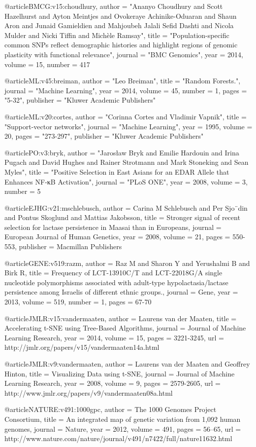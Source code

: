 @article{BMCG:v15:choudhury,
	author = "Ananyo Choudhury and Scott Hazelhurst and Ayton Meintjes and Ovokeraye Achinike-Oduaran and Shaun Aron and Junaid Gamieldien and Mahjoubeh Jalali Sefid Dashti and Nicola Mulder and Nicki Tiffin and Michèle Ramsay",
	title  = "Population-specific common SNPs reflect demographic histories and highlight regions of genomic plasticity with functional relevance",
	journal = "BMC Genomics",
	year = 2014,
	volume = 15,
	number = 417
}

@article{ML:v45:breiman,
	author = "Leo Breiman",
	title  = "Random Forests.",
	journal = "Machine Learning",
	year = 2014,
	volume = 45,
	number = 1,
	pages  = "5-32",
	publisher = "Kluwer Academic Publishers"
}

@article{ML:v20:cortes,
	author = "Corinna Cortes and Vladimir Vapnik",
	title  = "Support-vector networks",
	journal = "Machine Learning",
	year = 1995,
	volume = 20,
	pages  = "273-297",
	publisher = "Kluwer Academic Publishers"
}

@article{PO:v3:bryk,
	author = "Jarosław Bryk and Emilie Hardouin and Irina Pugach and David Hughes and Rainer Strotmann and Mark Stoneking and Sean Myles",
	title  = "Positive Selection in East Asians for an EDAR Allele that Enhances NF-κB Activation",
	journal = "PLoS ONE",
	year = 2008,
	volume = 3,
	number = 5
}

@article{EJHG:v21:mschlebusch,
	author    = {Carina M Schlebusch and Per Sjo¨din and Pontus Skoglund and Mattias Jakobsson},
	title     = {Stronger signal of recent selection for lactase persistence in Maasai than in Europeans},
	journal   = {European Journal of Human Genetics},
	year      = {2008},
	volume    = {21},
	pages     = {550-553},
	publisher = {Macmillan Publishers}
}

@article{GENE:v519:razm,
	author  = {Raz M and Sharon Y and Yerushalmi B and Birk R},
	title   = {Frequency of LCT-13910C/T and LCT-22018G/A single nucleotide polymorphisms associated with adult-type hypolactasia/lactase persistence among Israelis of different ethnic groups.},
	journal = {Gene},
	year    = {2013},
	volume  = {519},
	number  = {1},
	pages   = {67-70}
}

@article{JMLR:v15:vandermaaten,
	author  = {Laurens van der Maaten},
	title   = {Accelerating t-SNE using Tree-Based Algorithms},
	journal = {Journal of Machine Learning Research},
	year    = {2014},
	volume  = {15},
	pages   = {3221-3245},
	url     = {http://jmlr.org/papers/v15/vandermaaten14a.html}
}

@article{JMLR:v9:vandermaaten,
	author  = {Laurens van der Maaten and Geoffrey Hinton},
	title   = {Visualizing Data using t-SNE},
	journal = {Journal of Machine Learning Research},
	year    = {2008},
	volume  = {9},
	pages   = {2579-2605},
	url     = {http://www.jmlr.org/papers/v9/vandermaaten08a.html}
}

@article{NATURE:v491:1000gpc,
	author  = {The 1000 Genomes Project Consortium},
	title   = {An integrated map of genetic variation from 1,092 human genomes},
	journal = {Nature},
	year    = {2012},
	volume  = {491},
	pages   = {56–65},
	url     = {http://www.nature.com/nature/journal/v491/n7422/full/nature11632.html}
}